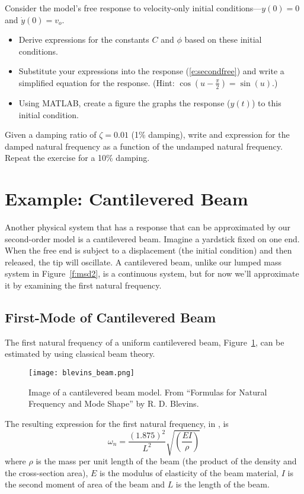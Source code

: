 \begin{ex}
Consider the model's free response to velocity-only initial conditions---$y(0)=0$ and $\dot{y}(0)=v_o$.
\begin{itemize}
\item Derive expressions for the constants $C$ and $\phi$ based on these initial conditions.
\item Substitute your expressions into the response (\ref{e:secondfree}) and write a simplified equation for the response.  (Hint: $\cos\left(u-\frac{\pi}{2}\right) = \sin(u)$.)
\item Using MATLAB, create a figure the graphs the response ($y(t)$) to this initial condition.
\end{itemize}
\end{ex}


\begin{ex}
Given a damping ratio of $\zeta=0.01$ (1\% damping), write and expression for the damped natural frequency as a function of the undamped natural frequency.  \\
Repeat the exercise for a 10\% damping.
\end{ex}

\section{Example: Cantilevered Beam}
Another physical system that has a response that can be approximated by our second-order model is a cantilevered beam.  Imagine a yardstick fixed on one end.  When the free end is subject to a displacement (the initial condition) and then released, the tip will oscillate.  A cantilevered beam, unlike our lumped mass system in Figure~\ref{f:msd2}, is a continuous system, but for now we'll approximate it by examining the first natural frequency.  

\subsection{First-Mode of Cantilevered Beam}
The first natural frequency of a uniform cantilevered beam, Figure~\ref{f:blevins}, can be estimated by using classical beam theory.
\begin{figure}[htb!]
\centerline{
{\texttt{[image: blevins\_beam.png]}}}
\caption{Image of a cantilevered beam model.  From ``Formulas for Natural Frequency and Mode Shape'' by R. D. Blevins.}
\label{f:blevins}
\end{figure}
The resulting expression for the first natural frequency, in , is
\begin{equation}\label{e:blevins}
\omega_n = \frac{(1.875)^2}{L^2} \sqrt{\left( \frac{EI}{\rho} \right)}
\end{equation}
where $\rho$ is the mass per unit length of the beam (the product of the density and the cross-section area), $E$ is the modulus of elasticity of the beam material, $I$ is the second moment of area of the beam and $L$ is the length of the beam. 

